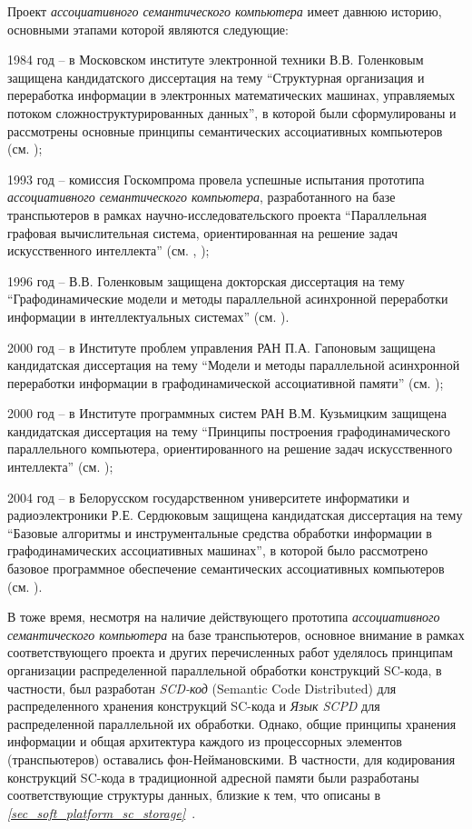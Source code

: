 Проект \textit{ассоциативного семантического компьютера} имеет давнюю историю, основными этапами которой являются следующие:
\begin{textitemize}
\item 1984 год -- в Московском  институте электронной техники В.В. Голенковым защищена кандидатского диссертация на тему ``Структурная организация и переработка информации в электронных математических машинах, управляемых потоком сложноструктурированных данных'', в которой были сформулированы и рассмотрены основные принципы семантических ассоциативных компьютеров (см. );
\item 1993 год -- комиссия Госкомпрома провела успешные испытания прототипа \textit{ассоциативного семантического компьютера}, разработанного на базе транспьютеров в рамках научно-исследовательского проекта ``Параллельная графовая вычислительная система, ориентированная на решение задач искусственного интеллекта'' (см. , );
\item 1996 год -- В.В. Голенковым защищена докторская диссертация на тему ``Графодинамические модели и методы параллельной асинхронной переработки информации в интеллектуальных системах'' (см. ). 
\item 2000 год -- в Институте проблем управления РАН П.А. Гапоновым защищена кандидатская диссертация на тему ``Модели и методы параллельной асинхронной переработки информации в графодинамической ассоциативной памяти'' (см. );
\item 2000 год -- в Институте программных систем РАН В.М. Кузьмицким защищена кандидатская диссертация на тему ``Принципы построения графодинамического параллельного компьютера, ориентированного на решение задач искусственного интеллекта'' (см. );
\item 2004 год -- в Белорусском государственном университете информатики и радиоэлектроники Р.Е. Сердюковым защищена кандидатская диссертация на тему ``Базовые алгоритмы и инструментальные средства обработки информации в графодинамических ассоциативных машинах'', в которой было рассмотрено базовое программное обеспечение семантических ассоциативных компьютеров (см. ).
\end{textitemize}

В тоже время, несмотря на наличие действующего прототипа \textit{ассоциативного семантического компьютера} на базе транспьютеров, основное внимание в рамках соответствующего проекта и других перечисленных работ уделялось принципам организации распределенной параллельной обработки конструкций SC-кода, в частности, был разработан \textit{SCD-код} (Semantic Code Distributed) для распределенного хранения конструкций SC-кода и \textit{Язык SCPD} для распределенной параллельной их обработки. Однако, общие принципы хранения информации и общая архитектура каждого из процессорных элементов (транспьютеров) оставались фон-Неймановскими. В частности, для кодирования конструкций SC-кода в традиционной адресной памяти были разработаны соответствующие структуры данных, близкие к тем, что описаны в \textit{\ref{sec_soft_platform_sc_storage}~}.

